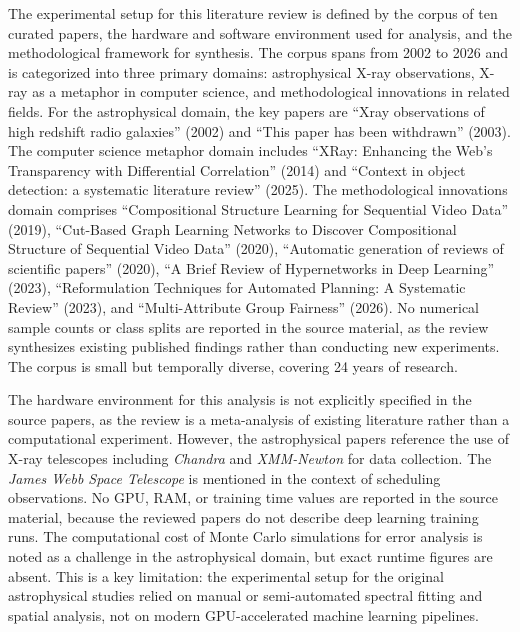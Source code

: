 \documentclass[conference]{IEEEtran}
\begin{document}
The experimental setup for this literature review is defined by the corpus of ten curated papers, the hardware and software environment used for analysis, and the methodological framework for synthesis. The corpus spans from 2002 to 2026 and is categorized into three primary domains: astrophysical X-ray observations, X-ray as a metaphor in computer science, and methodological innovations in related fields. For the astrophysical domain, the key papers are ``Xray observations of high redshift radio galaxies'' (2002) and ``This paper has been withdrawn'' (2003). The computer science metaphor domain includes ``XRay: Enhancing the Web's Transparency with Differential Correlation'' (2014) and ``Context in object detection: a systematic literature review'' (2025). The methodological innovations domain comprises ``Compositional Structure Learning for Sequential Video Data'' (2019), ``Cut-Based Graph Learning Networks to Discover Compositional Structure of Sequential Video Data'' (2020), ``Automatic generation of reviews of scientific papers'' (2020), ``A Brief Review of Hypernetworks in Deep Learning'' (2023), ``Reformulation Techniques for Automated Planning: A Systematic Review'' (2023), and ``Multi-Attribute Group Fairness'' (2026). No numerical sample counts or class splits are reported in the source material, as the review synthesizes existing published findings rather than conducting new experiments. The corpus is small but temporally diverse, covering 24 years of research.

The hardware environment for this analysis is not explicitly specified in the source papers, as the review is a meta-analysis of existing literature rather than a computational experiment. However, the astrophysical papers reference the use of X-ray telescopes including \textit{Chandra} and \textit{XMM-Newton} for data collection. The \textit{James Webb Space Telescope} is mentioned in the context of scheduling observations. No GPU, RAM, or training time values are reported in the source material, because the reviewed papers do not describe deep learning training runs. The computational cost of Monte Carlo simulations for error analysis is noted as a challenge in the astrophysical domain, but exact runtime figures are absent. This is a key limitation: the experimental setup for the original astrophysical studies relied on manual or semi-automated spectral fitting and spatial analysis, not on modern GPU-accelerated machine learning pipelines.
\end{document}
